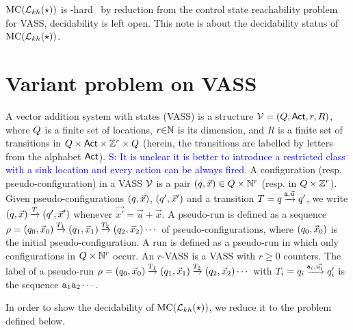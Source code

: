 \documentclass[envcountsame,a4paper,12pt]{llncs}
\begin{document}
     ${\rm MC (}\mathcal{L}_{kh}(\star){\rm )}$ is \expspace-hard~\cite{Demri&Fervari23}
     by reduction from the control state reachability problem for VASS, decidability is left open.
     This note is about the decidability status of ${\rm MC (}\mathcal{L}_{kh}(\star){\rm )}$.
     

     \section{Variant problem on VASS}

     
A vector addition system with states (VASS)
  is a structure
  $\mathcal{V} = (Q,{\rm \sf Act},r,R)$, where
  $Q$ is a finite set of locations,
  $r{\in}\mathbb{N}$ is its dimension, 
  and $R$ is a finite set of transitions in $Q \times {\rm \sf Act} \times \mathbb{Z}^r
  \times Q$ (herein, the transitions are labelled by letters from the alphabet ${\rm \sf Act}$).
  \textcolor{blue}{S: It is unclear it is better to introduce a restricted class with a sink location and every action can be always fired.}
  A configuration (resp. pseudo-configuration)  in a VASS $\mathcal{V}$ is
a pair $(q,\vec{x}) \in Q \times \mathbb{N}^r$ (resp. in $Q \times \mathbb{Z}^r$).
Given pseudo-configurations $(q,\vec{x})$,
$(q',\vec{x}')$ and a transition $T =
q \xrightarrow{\!\!\mathtt{a},\vec{u}\!\!} q'$, we write
$(q,\vec{x}) \xrightarrow{\!\!T\!\!}
(q',\vec{x}')$ whenever $\vec{x'} = \vec{u} + \vec{x}$.
A pseudo-run is defined as a sequence $\arun =
\pair{\alocation_0}{\vec{x}_0} \step{\atransition_1}
\pair{\alocation_1}{\vec{x}_1} \step{\atransition_2}
\pair{\alocation_2}{\vec{x}_2} \cdots$ of pseudo-configurations, where
$(q_0,\vec{x}_0)$ is the initial
pseudo-configuration. A run is defined as a pseudo-run in which 
only configurations in $Q \times \mathbb{N}^r$ occur. 
An $r$-VASS is a VASS with $r \geq 0$
counters. 
The label of a pseudo-run $\arun =
\pair{\alocation_0}{\vec{x}_0} \step{\atransition_1}
\pair{\alocation_1}{\vec{x}_1} \step{\atransition_2}
\pair{\alocation_2}{\vec{x}_2} \cdots$ with
$T_i = 
q_i \xrightarrow{\!\!\mathtt{a}_i,\vec{u_i}\!\!} q'_i$
is the sequence $\mathtt{a}_1 \mathtt{a}_2 \cdots$. 

In order to show the decidability of  ${\rm MC (}\mathcal{L}_{kh}(\star){\rm )}$, we reduce it to the
problem \ourvasspb defined below.
\end{document}
